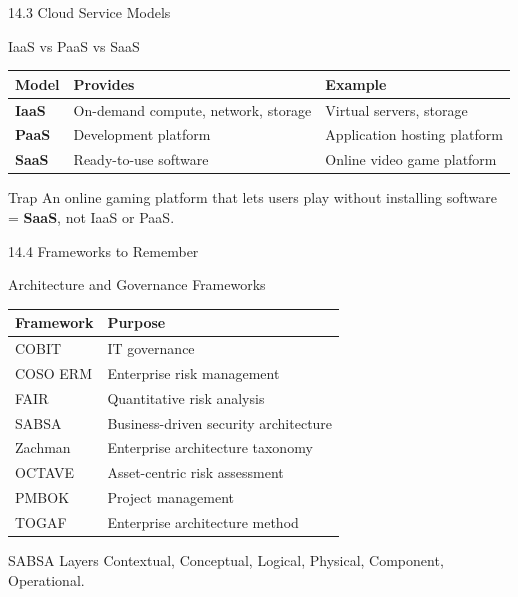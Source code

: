 \documentclass{beamer}
\begin{document}
	\begin{frame}{14.3 Cloud Service Models}
		\begin{block}{IaaS vs PaaS vs SaaS}
			\begin{tabular}{|p{2cm}|p{5cm}|p{4.5cm}|}
				\hline
				\textbf{Model} & \textbf{Provides} & \textbf{Example} \\
				\hline
				\textbf{IaaS} & On-demand compute, network, storage & Virtual servers, storage \\
				\hline
				\textbf{PaaS} & Development platform & Application hosting platform \\
				\hline
				\textbf{SaaS} & Ready-to-use software & Online video game platform \\
				\hline
			\end{tabular}
		\end{block}
		
		\begin{alertblock}{Trap}
			An online gaming platform that lets users play without installing software = \textbf{SaaS}, not IaaS or PaaS.
		\end{alertblock}
	\end{frame}
	
	\begin{frame}{14.4 Frameworks to Remember}
		\begin{block}{Architecture and Governance Frameworks}
			\begin{tabular}{|p{3cm}|p{8cm}|}
				\hline
				\textbf{Framework} & \textbf{Purpose} \\
				\hline
				COBIT & IT governance \\
				\hline
				COSO ERM & Enterprise risk management \\
				\hline
				FAIR & Quantitative risk analysis \\
				\hline
				SABSA & Business-driven security architecture \\
				\hline
				Zachman & Enterprise architecture taxonomy \\
				\hline
				OCTAVE & Asset-centric risk assessment \\
				\hline
				PMBOK & Project management \\
				\hline
				TOGAF & Enterprise architecture method \\
				\hline
			\end{tabular}
		\end{block}
		
		\begin{exampleblock}{SABSA Layers}
			Contextual, Conceptual, Logical, Physical, Component, Operational.
		\end{exampleblock}
	\end{frame}
	
\end{document}
